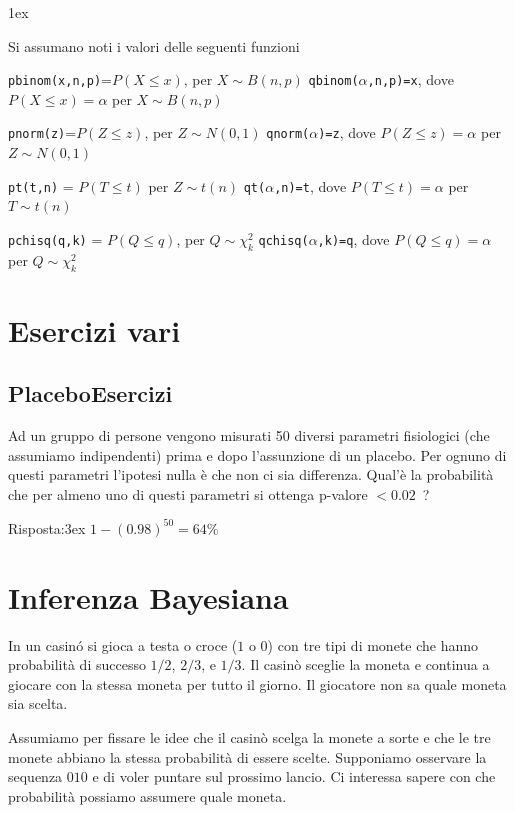 \documentclass[12pt,openany]{book}
\theoremstyle{mio}
\theoremstyle{liscio}
\begin{document}
\parskip1ex
{\hrulefill\scriptsize

Si assumano noti i valori delle seguenti funzioni

{\tt pbinom(x,n,p)}=$P(X\le x)$, per $X\sim B(n,p)$
\hfill 
{\tt qbinom($\alpha$,n,p)=x},  dove $P(X\le x)=\alpha$ per $X\sim B(n,p)$

{\tt pnorm(z)}=$P(Z\le z)$, per $Z\sim N(0,1)$
\hfill 
{\tt qnorm($\alpha$)=z},  dove $P(Z\le z)=\alpha$ per $Z\sim N(0,1)$

{\tt pt(t,n)} = $P(T\le t)$ per $Z\sim t(n)$
\hfill
{\tt qt($\alpha$,n)=t}, dove $P(T\le t)=\alpha$ per $T\sim t(n)$

{\tt pchisq(q,k)} = $P(Q\le q)$, per $Q\sim \chi^2_k$
\hfill
{\tt qchisq($\alpha$,k)=q},  dove $P(Q\le q)=\alpha$ per $Q\sim \chi^2_k$
\par
}







\clearpage\section{Esercizi vari}
\subsection{Placebo\hfill Esercizi}


Ad un gruppo di persone vengono misurati 50 diversi parametri fisiologici (che assumiamo indipendenti) prima e dopo l'assunzione di un placebo. Per ognuno di questi parametri l'ipotesi nulla è che non ci sia differenza. Qual'è la probabilità che per almeno uno di questi parametri si ottenga p-valore $<0.02$~?


Risposta:\kern3ex $1-(0.98)^{50}=64\%$


\section{Inferenza Bayesiana}

In un casinó si gioca a testa o croce ($1$ o $0$) con tre tipi di monete che hanno probabilità di successo $1/2$, $2/3$, e $1/3$. Il casinò sceglie la moneta e continua a giocare con la stessa moneta per tutto il giorno. Il giocatore non sa quale moneta sia scelta.

Assumiamo per fissare le idee che il casinò scelga la monete a sorte e che le tre monete abbiano la stessa probabilità di essere scelte. Supponiamo osservare la sequenza $010$ e di voler puntare sul prossimo lancio. Ci interessa sapere con che probabilità possiamo assumere quale moneta.  
\end{document}
